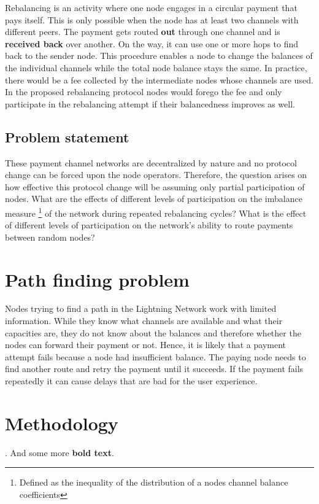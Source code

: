 \documentclass[draft]{fhnwreport}       %
\begin{document}
Rebalancing is an activity where one node engages in a circular payment that pays itself. This is only possible when the node has at least two channels with different peers. The payment gets routed \textbf{out} through one channel and is \textbf{received back} over another. On the way, it can use one or more hops to find back to the sender node. This procedure enables a node to change the balances of the individual channels while the total node balance stays the same. In practice, there would be a fee collected by the intermediate nodes whose channels are used. In the proposed rebalancing protocol nodes would forego the fee and only participate in the rebalancing attempt if their balancedness improves as well.

\subsection{Problem statement}
These payment channel networks are decentralized by nature and no protocol change can be forced upon the node operators. Therefore, the question arises on how effective this protocol change will be assuming only partial participation of nodes. What are the effects of different levels of participation on the imbalance measure \footnote{Defined as the inequality of the distribution of a nodes channel balance coefficients} of the network during repeated rebalancing cycles? What is the effect of different levels of participation on the network's ability to route payments between random nodes? 


\section{Path finding problem}

Nodes trying to find a path in the Lightning Network work with limited information. While they know what channels are available and what their capacities are, they do not know about the balances and therefore whether the nodes can forward their payment or not. Hence, it is likely that a payment attempt fails because a node had insufficient balance. The paying node needs to find another route and retry the payment until it succeeds. If the payment fails repeatedly it can cause delays that are bad for the user experience. 

\section{Methodology} \label{sec:method}
. And some more \textbf{bold text}.
\end{document}
